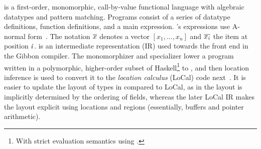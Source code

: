 \systemlang{} is a first-order, monomorphic, call-by-value functional language
with algebraic datatypes and pattern matching.
%
Programs consist of a series of datatype definitions, function definitions, and a main expression.
%
\systemlang{}'s expressions use A-normal form~\cite{ANF}.
%
The notation $\overline{x}$ denotes a vector $ [x_1, \ldots, x_n] $ and $\overline{x_{\mathit{i}}}$
the item at position $\mathit{i}$.
%
\systemlang{} is an intermediate representation (IR) used towards the front end in the Gibbon compiler.
The monomorphizer and specializer lower a program written in a polymorphic, higher-order subset of Haskell\footnote{With strict evaluation semantics using .} to \systemlang{},
and then location inference is used to convert it to the {\em location calculus} (LoCal) code next~\cite{Local}.
%
It is easier to update the layout of types in \systemlang{} compared to LoCal,
as in \systemlang{} the layout is implicitly determined by the ordering of fields,
whereas the later LoCal IR makes the layout explicit using locations and regions (essentially, buffers and pointer arithmetic).

\begin{figure}[t]
	\small
	
	\normalsize
        \caption{}
	\label{fig:grammar}  
\end{figure}

%
%

%

